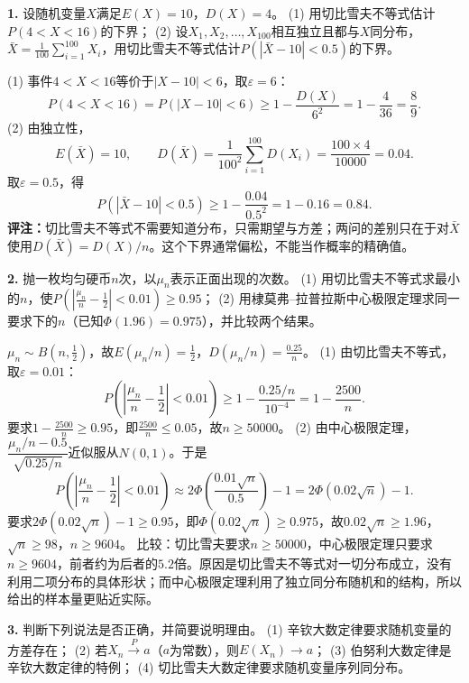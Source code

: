 \textbf{1.} 设随机变量$X$满足$E(X)=10$，$D(X)=4$。
(1) 用切比雪夫不等式估计$P(4<X<16)$的下界；
(2) 设$X_1,X_2,\ldots,X_{100}$相互独立且都与$X$同分布，$\bar X=\frac{1}{100}\sum_{i=1}^{100}X_i$，用切比雪夫不等式估计$P(|\bar X-10|<0.5)$的下界。

\ifshowsolutions%
(1) 事件$4<X<16$等价于$|X-10|<6$，取$\varepsilon=6$：
\[
P(4<X<16)=P(|X-10|<6)\geq1-\frac{D(X)}{6^{2}}=1-\frac{4}{36}=\frac{8}{9}.
\]
(2) 由独立性，
\[
E(\bar X)=10,\qquad D(\bar X)=\frac{1}{100^{2}}\sum_{i=1}^{100}D(X_i)=\frac{100\times4}{10000}=0.04.
\]
取$\varepsilon=0.5$，得
\[
P(|\bar X-10|<0.5)\geq1-\frac{0.04}{0.5^{2}}=1-0.16=0.84.
\]
\textbf{评注：}切比雪夫不等式不需要知道分布，只需期望与方差；两问的差别只在于对$\bar X$使用$D(\bar X)=D(X)/n$。这个下界通常偏松，不能当作概率的精确值。
\par\noindent{}

\vspace{0.4cm}

\else \answerarea[8] \fi%
%
\textbf{2.} 抛一枚均匀硬币$n$次，以$\mu_n$表示正面出现的次数。
(1) 用切比雪夫不等式求最小的$n$，使$P\!\left(\left|\frac{\mu_n}{n}-\frac12\right|<0.01\right)\geq0.95$；
(2) 用棣莫弗--拉普拉斯中心极限定理求同一要求下的$n$（已知$\Phi(1.96)=0.975$），并比较两个结果。

\ifshowsolutions%
$\mu_n\sim B(n,\frac12)$，故$E(\mu_n/n)=\frac12$，$D(\mu_n/n)=\frac{0.25}{n}$。
(1) 由切比雪夫不等式，取$\varepsilon=0.01$：
\[
P\!\left(\left|\frac{\mu_n}{n}-\frac12\right|<0.01\right)\geq1-\frac{0.25/n}{10^{-4}}=1-\frac{2500}{n}.
\]
要求$1-\frac{2500}{n}\geq0.95$，即$\frac{2500}{n}\leq0.05$，故$n\geq50000$。
(2) 由中心极限定理，$\dfrac{\mu_n/n-0.5}{\sqrt{0.25/n}}$近似服从$N(0,1)$。于是
\[
P\!\left(\left|\frac{\mu_n}{n}-\frac12\right|<0.01\right)
\approx2\Phi\!\left(\frac{0.01\sqrt n}{0.5}\right)-1
=2\Phi(0.02\sqrt n)-1.
\]
要求$2\Phi(0.02\sqrt n)-1\geq0.95$，即$\Phi(0.02\sqrt n)\geq0.975$，故$0.02\sqrt n\geq1.96$，$\sqrt n\geq98$，$n\geq9604$。
比较：切比雪夫要求$n\geq50000$，中心极限定理只要求$n\geq9604$，前者约为后者的$5.2$倍。原因是切比雪夫不等式对一切分布成立，没有利用二项分布的具体形状；而中心极限定理利用了独立同分布随机和的结构，所以给出的样本量更贴近实际。
\par\noindent{}

\vspace{0.4cm}

\else \answerarea[8] \fi%
%
\textbf{3.} 判断下列说法是否正确，并简要说明理由。
(1) 辛钦大数定律要求随机变量的方差存在；
(2) 若$X_n\overset{P}{\longrightarrow}a$（$a$为常数），则$E(X_n)\to a$；
(3) 伯努利大数定律是辛钦大数定律的特例；
(4) 切比雪夫大数定律要求随机变量序列同分布。

